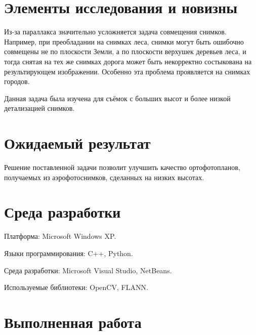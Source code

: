 \documentclass[a4paper,12pt]{article}
\begin{document}
\section{Элементы исследования и новизны}
Из-за параллакса значительно усложняется задача совмещения снимков. 
Например, при преобладании на снимках леса,
снимки могут быть ошибочно совмещены не по плоскости Земли, 
а по плоскости верхушек деревьев леса, и
тогда снятая на тех же снимках дорога может быть некорректно состыкована на
результирующем изображении.
Особенно эта проблема проявляется на снимках городов.

Данная задача была изучена для съёмок с больших высот и более низкой 
детализацией снимков.

\section{Ожидаемый результат}
Решение поставленной задачи позволит улучшить качество ортофотопланов, 
получаемых из аэрофотоснимков, сделанных на низких высотах. 

\section{Среда разработки}

Платформа: Microsoft Windows XP.

Языки программирования: C++, Python.

Среда разработки: Microsoft Visual Studio, NetBeans.

Используемые библиотеки: OpenCV, FLANN. %

\section{Выполненная работа}

% 
% 
%    
% 
% 
% 
\end{document}
